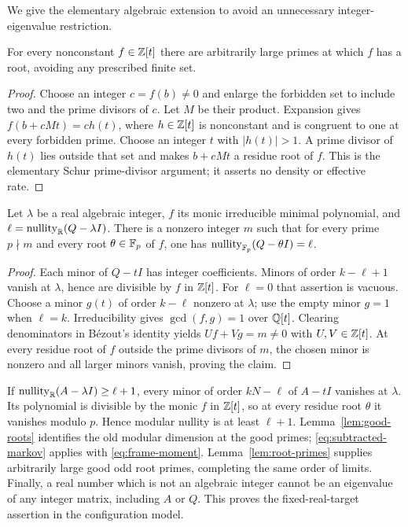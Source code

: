 We give the elementary algebraic extension to avoid an unnecessary
integer-eigenvalue restriction.
\begin{lemma}\label{lem:root-primes}
For every nonconstant $f\in\mathbb Z[t]$ there are arbitrarily large primes
at which $f$ has a root, avoiding any prescribed finite set.
\end{lemma}
\begin{proof}
Choose an integer $c=f(b)\ne0$ and enlarge the forbidden set to
include two and the prime divisors of $c$. Let $M$ be their product.
Expansion gives $f(b+cMt)=c h(t)$, where $h\in\mathbb Z[t]$ is nonconstant
and is congruent to one at every forbidden prime. Choose an integer
$t$ with $|h(t)|>1$. A prime divisor of $h(t)$ lies outside that set
and makes $b+cMt$ a residue root of $f$. This is the elementary
Schur prime-divisor argument; it asserts no density or effective rate.
\end{proof}

\begin{lemma}\label{lem:good-roots}
Let $\lambda$ be a real algebraic integer, $f$ its monic irreducible
minimal polynomial, and $\ell=\operatorname{nullity}_\mathbb R(Q-\lambda I)$. There is a
nonzero integer $m$ such that for every prime $p\nmid m$ and every
root $\theta\in\mathbb F_p$ of $f$, one has
$\operatorname{nullity}_{\mathbb F_p}(Q-\theta I)=\ell$.
\end{lemma}
\begin{proof}
Each minor of $Q-tI$ has integer coefficients. Minors of order
$k-\ell+1$ vanish at $\lambda$, hence are divisible by $f$ in
$\mathbb Z[t]$. For $\ell=0$ that assertion is vacuous. Choose a minor
$g(t)$ of order $k-\ell$ nonzero at $\lambda$; use the empty minor
$g=1$ when $\ell=k$. Irreducibility gives $\gcd(f,g)=1$ over
$\mathbb Q[t]$. Clearing denominators in B\'ezout's identity yields
$Uf+Vg=m\ne0$ with $U,V\in\mathbb Z[t]$. At every residue root of $f$
outside the prime divisors of $m$, the chosen minor is nonzero and
all larger minors vanish, proving the claim.
\end{proof}

If $\operatorname{nullity}_\mathbb R(A-\lambda I)\ge\ell+1$, every minor of order
$kN-\ell$ of $A-tI$ vanishes at $\lambda$. Its polynomial is
divisible by the monic $f$ in $\mathbb Z[t]$, so at every residue root
$\theta$ it vanishes modulo $p$. Hence modular nullity is at least
$\ell+1$. Lemma~\ref{lem:good-roots} identifies the old modular
dimension at the good primes; \eqref{eq:subtracted-markov} applies
with \eqref{eq:frame-moment}. Lemma~\ref{lem:root-primes} supplies
arbitrarily large good odd root primes, completing the same order of
limits. Finally, a real number which is not an algebraic integer
cannot be an eigenvalue of any integer matrix, including $A$ or $Q$.
This proves the fixed-real-target assertion in the configuration model.

